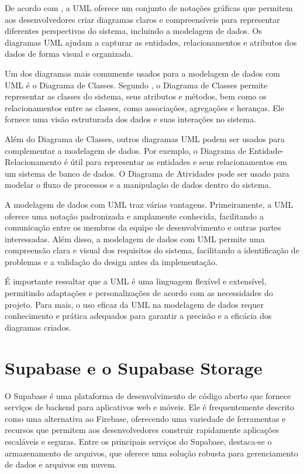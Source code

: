 De acordo com \cite{rumbaugh2004unified}, a UML oferece um
conjunto de notações gráficas que permitem aos desenvolvedores criar diagramas claros e
compreensíveis para representar diferentes perspectivas do sistema, incluindo a modelagem de
dados. Os diagramas UML ajudam a capturar as entidades, relacionamentos e atributos dos dados
de forma visual e organizada.

Um dos diagramas mais comumente usados para a modelagem de dados com UML é o
Diagrama de Classes. Segundo \cite{Larman2004}, o Diagrama de Classes permite representar
as classes do sistema, seus atributos e métodos, bem como os relacionamentos entre as classes,
como associações, agregações e heranças. Ele fornece uma visão estruturada dos dados e suas
interações no sistema.

Além do Diagrama de Classes, outros diagramas UML podem ser usados para complementar a modelagem de dados. Por exemplo, o Diagrama de Entidade-Relacionamento é útil para
representar as entidades e seus relacionamentos em um sistema de banco de dados. O Diagrama
de Atividades pode ser usado para modelar o fluxo de processos e a manipulação de dados dentro
do sistema.

A modelagem de dados com UML traz várias vantagens. Primeiramente, a UML oferece
uma notação padronizada e amplamente conhecida, facilitando a comunicação entre os membros
da equipe de desenvolvimento e outras partes interessadas. Além disso, a modelagem de dados
com UML permite uma compreensão clara e visual dos requisitos do sistema, facilitando a
identificação de problemas e a validação do design antes da implementação.

É importante ressaltar que a UML é uma linguagem flexível e extensível, permitindo
adaptações e personalizações de acordo com as necessidades do projeto. Para mais, o uso eficaz
da UML na modelagem de dados requer conhecimento e prática adequados para garantir a
precisão e a eficácia dos diagramas criados.


\section{Supabase e o Supabase Storage}

O Supabase é uma plataforma de desenvolvimento de código aberto que fornece serviços
de backend para aplicativos web e móveis. Ele é frequentemente descrito como uma alternativa ao
Firebase, oferecendo uma variedade de ferramentas e recursos que permitem aos desenvolvedores
construir rapidamente aplicações escaláveis e seguras. Entre os principais serviços do Supabase,
destaca-se o armazenamento de arquivos, que oferece uma solução robusta para gerenciamento
de dados e arquivos em nuvem.

